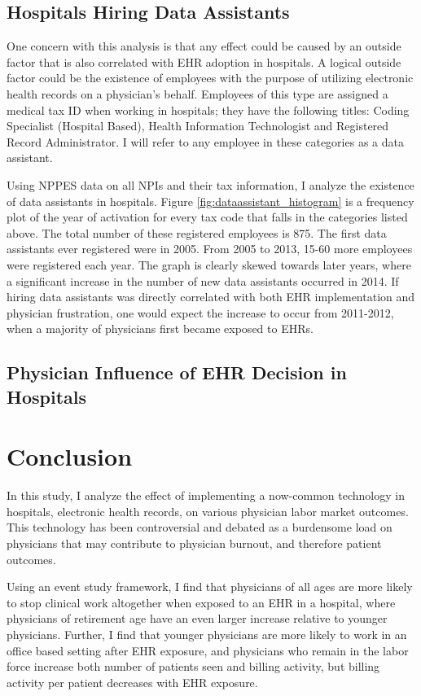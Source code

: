 \documentclass[11pt]{article}
\begin{document}
\subsection{Hospitals Hiring Data Assistants}\label{sec:dataass}

One concern with this analysis is that any effect could be caused by an outside factor that is also correlated with EHR adoption in hospitals. A logical outside factor could be the existence of employees with the purpose of utilizing electronic health records on a physician's behalf. Employees of this type are assigned a medical tax ID when working in hospitals; they have the following titles: Coding Specialist (Hospital Based), Health Information Technologist and Registered Record Administrator. I will refer to any employee in these categories as a data assistant. 

Using NPPES data on all NPIs and their tax information, I analyze the existence of data assistants in hospitals. Figure \ref{fig:dataassistant_histogram} is a frequency plot of the year of activation for every tax code that falls in the categories listed above. The total number of these registered employees is 875. The first data assistants ever registered were in 2005. From 2005 to 2013, 15-60 more employees were registered each year. The graph is clearly skewed towards later years, where a significant increase in the number of new data assistants occurred in 2014. If hiring data assistants was directly correlated with both EHR implementation and physician frustration, one would expect the increase to occur from 2011-2012, when a majority of physicians first became exposed to EHRs. 

\subsection{Physician Influence of EHR Decision in Hospitals}


\section{Conclusion}

In this study, I analyze the effect of implementing a now-common technology in hospitals, electronic health records, on various physician labor market outcomes. This technology has been controversial and debated as a burdensome load on physicians that may contribute to physician burnout, and therefore patient outcomes. 

Using an event study framework, I find that physicians of all ages are more likely to stop clinical work altogether when exposed to an EHR in a hospital, where physicians of retirement age have an even larger increase relative to younger physicians. Further, I find that younger physicians are more likely to work in an office based setting after EHR exposure, and physicians who remain in the labor force increase both number of patients seen and billing activity, but billing activity per patient decreases with EHR exposure. 
\end{document}
